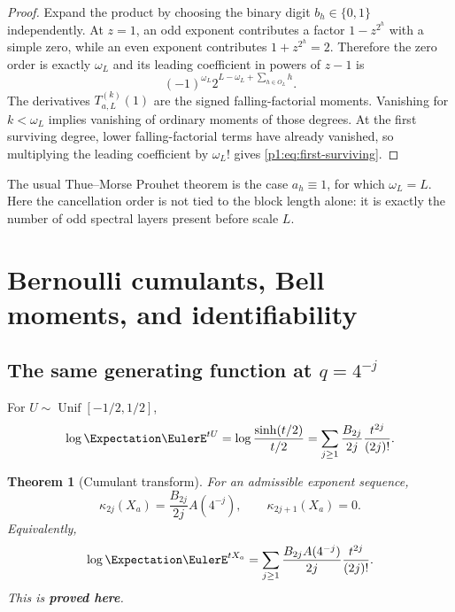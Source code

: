 \documentclass[11pt,oneside]{article}
\numberwithin{equation}{section}
\newtheorem{theorem}{Theorem}[section]
\theoremstyle{definition}
\theoremstyle{remark}
\newcommand{\statusproved}{\textcolor{deepgreen}{\textbf{proved here}}}
\begin{document}
\begin{proof}
Expand the product by choosing the binary digit $b_h\in\{0,1\}$ independently.  At $z=1$,
an odd exponent contributes a factor $1-z^{2^h}$ with a simple zero, while an even exponent
contributes $1+z^{2^h}=2$.  Therefore the zero order is exactly $\omega_L$ and its leading
coefficient in powers of $z-1$ is
\[
 (-1)^{\omega_L}2^{L-\omega_L+\sum_{h\in O_L}h}.
\]
The derivatives $T_{a,L}^{(k)}(1)$ are the signed falling-factorial moments.  Vanishing for
$k<\omega_L$ implies vanishing of ordinary moments of those degrees.  At the first surviving
degree, lower falling-factorial terms have already vanished, so multiplying the leading
coefficient by $\omega_L!$ gives \eqref{p1:eq:first-surviving}.
\end{proof}

\begin{remark}
The usual Thue--Morse Prouhet theorem is the case $a_h\equiv1$, for which
$\omega_L=L$.  Here the cancellation order is not tied to the block length alone: it is
exactly the number of odd spectral layers present before scale $L$.
\end{remark}

\section{Bernoulli cumulants, Bell moments, and identifiability}
\label{p1:sec:cumulants}

\subsection{The same generating function at $q=4^{-j}$}

For $U\sim\operatorname{Unif}[-1/2,1/2]$,
\begin{equation}
 \log\Expectation\EulerE^{tU}
 =\log\frac{\sinh(t/2)}{t/2}
 =\sum_{j\ge1}\frac{B_{2j}}{2j}\frac{t^{2j}}{(2j)!}.
 \label{p1:eq:uniform-cumulants}
\end{equation}

\begin{theorem}[Cumulant transform]
\label{p1:thm:cumulants}
For an admissible exponent sequence,
\begin{equation}
 \boxed{\quad
 \kappa_{2j}(X_a)=\frac{B_{2j}}{2j}A(4^{-j}),
 \qquad
 \kappa_{2j+1}(X_a)=0.
 \quad}
 \label{p1:eq:kappa-a}
\end{equation}
Equivalently,
\begin{equation}
 \log\Expectation\EulerE^{tX_a}
 =\sum_{j\ge1}\frac{B_{2j}A(4^{-j})}{2j}\frac{t^{2j}}{(2j)!}.
 \label{p1:eq:mgf-a}
\end{equation}
This is \statusproved.
\end{theorem}
\end{document}
